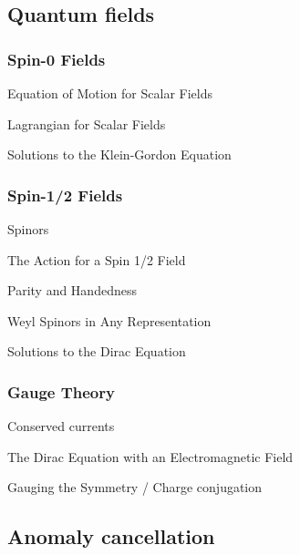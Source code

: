 {}

\subsection{Quantum fields}

\subsubsection{Spin-0 Fields}


Equation of Motion for Scalar Fields

Lagrangian for Scalar Fields

Solutions to the Klein-Gordon Equation

\subsubsection{Spin-1/2 Fields}

Spinors 

The Action for a Spin 1/2 Field

Parity and Handedness

Weyl Spinors in Any Representation

Solutions to the Dirac Equation

\subsubsection{Gauge Theory}

Conserved currents 

The Dirac Equation with an Electromagnetic Field

Gauging the Symmetry / Charge conjugation

\subsection{Anomaly cancellation}



